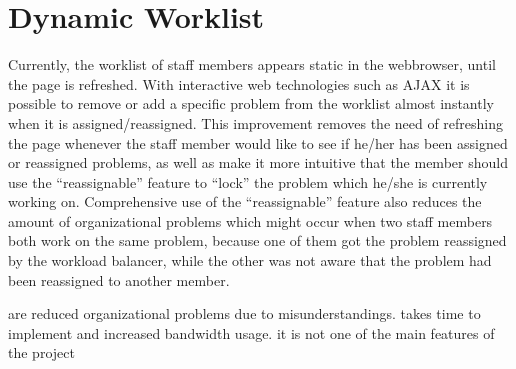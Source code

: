 \section{Dynamic Worklist}
\label{sec:dynamic_worklist}

Currently, the worklist of staff members appears static in the webbrowser, until the page is refreshed. With interactive web technologies such as AJAX it is possible to remove or add a specific problem from the worklist almost instantly when it is assigned/reassigned.
This improvement removes the need of refreshing the page whenever the staff member would like to see if he/her has been assigned or reassigned problems, as well as make it more intuitive that the member should use the ``reassignable'' feature to ``lock'' the problem which he/she is currently working on. Comprehensive use of the ``reassignable'' feature also reduces the amount of organizational problems which might occur when two staff members both work on the same problem, because one of them got the problem reassigned by the workload balancer, while the other was not aware that the problem had been reassigned to another member.

 are reduced organizational problems due to misunderstandings. 
 takes time to implement and increased bandwidth usage.
 it is not one of the main features of the project